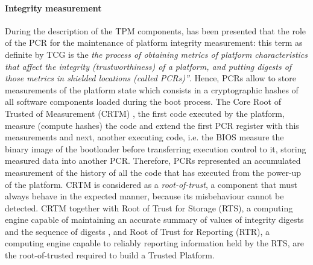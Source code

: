 \documentclass[../tesi.tex]{subfiles}
\begin{document}
\paragraph*{Integrity measurement}
During the description of the TPM components, has been presented that the role of the PCR for the maintenance of platform integrity measurement: this term as definite by TCG is the \emph{the process of obtaining metrics of platform characteristics that affect the integrity (trustworthiness) of a platform, and putting digests of those metrics in
shielded locations (called PCRs)”}. Hence, PCRs allow to store measurements of the platform state which consists in a cryptographic hashes of all software components loaded during the boot process. The Core Root of Trusted of Measurement (CRTM) , the first code executed by the platform, measure (compute hashes) the code and extend the first PCR register with this measurements and next, another executing code, i.e. the BIOS measure the binary image of the bootloader before transferring execution control to it, storing measured data into another PCR. Therefore, PCRs represented an accumulated measurement of the history of all the code that has executed from the power-up of the platform. CRTM is considered as a \emph{root-of-trust}, a component that must always behave in the expected manner, because its misbehaviour cannot be detected. CRTM together with Root of Trust for Storage (RTS), a computing engine capable of maintaining an accurate summary of values of integrity digests and the sequence of digests , and Root of Trust for Reporting (RTR), a computing engine capable to reliably reporting information held by the RTS, are the root-of-trusted required to build a Trusted Platform. 
\end{document}
